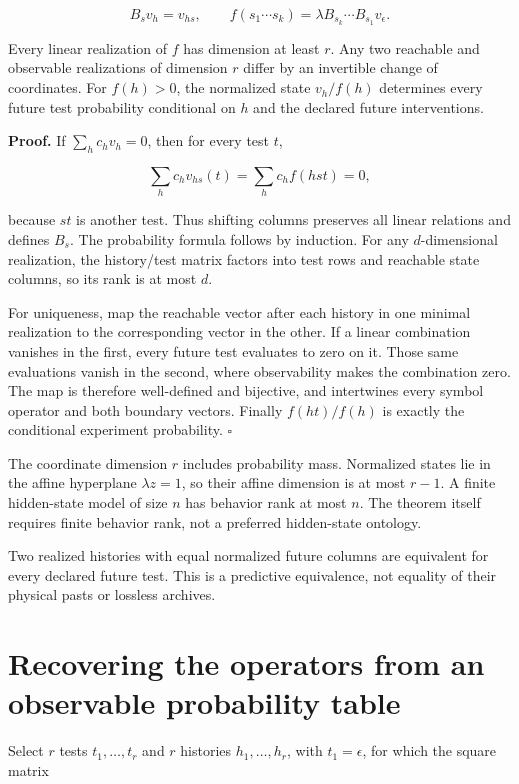 \[
B_sv_h=v_{hs},\qquad
f(s_1\cdots s_k)=\lambda B_{s_k}\cdots B_{s_1}v_\epsilon.
\]

Every linear realization of \(f\) has dimension at least \(r\). Any two
reachable and observable realizations of dimension \(r\) differ by an
invertible change of coordinates. For \(f(h)>0\), the normalized state
\(v_h/f(h)\) determines every future test probability conditional on
\(h\) and the declared future interventions.

\textbf{Proof.} If \(\sum_hc_hv_h=0\), then for every test \(t\),

\[
\sum_hc_hv_{hs}(t)=\sum_hc_hf(hst)=0,
\]

because \(st\) is another test. Thus shifting columns preserves all
linear relations and defines \(B_s\). The probability formula follows by
induction. For any \(d\)-dimensional realization, the history/test
matrix factors into test rows and reachable state columns, so its rank
is at most \(d\).

For uniqueness, map the reachable vector after each history in one
minimal realization to the corresponding vector in the other. If a
linear combination vanishes in the first, every future test evaluates to
zero on it. Those same evaluations vanish in the second, where
observability makes the combination zero. The map is therefore
well-defined and bijective, and intertwines every symbol operator and
both boundary vectors. Finally \(f(ht)/f(h)\) is exactly the conditional
experiment probability. \(\square\)

The coordinate dimension \(r\) includes probability mass. Normalized
states lie in the affine hyperplane \(\lambda z=1\), so their affine
dimension is at most \(r-1\). A finite hidden-state model of size \(n\)
has behavior rank at most \(n\). The theorem itself requires finite
behavior rank, not a preferred hidden-state ontology.

Two realized histories with equal normalized future columns are
equivalent for every declared future test. This is a predictive
equivalence, not equality of their physical pasts or lossless archives.

\section{Recovering the operators from an observable probability table}\label{LSM:recovering-the-operators-from-an-observable-probability-table}

Select \(r\) tests \(t_1,\ldots,t_r\) and \(r\) histories
\(h_1,\ldots,h_r\), with \(t_1=\epsilon\), for which the square matrix

